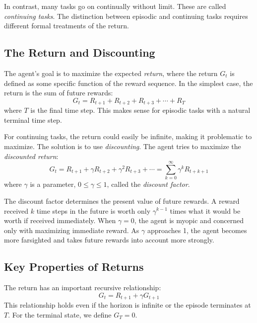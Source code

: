 \documentclass[12pt]{article}
\begin{document}
In contrast, many tasks go on continually without limit. These are called \textit{continuing tasks}. The distinction between episodic and continuing tasks requires different formal treatments of the return.

\subsection{The Return and Discounting}

The agent's goal is to maximize the expected \textit{return}, where the return $G_t$ is defined as some specific function of the reward sequence. In the simplest case, the return is the sum of future rewards:
\begin{equation}
G_t = R_{t+1} + R_{t+2} + R_{t+3} + \cdots + R_T
\end{equation}
where $T$ is the final time step. This makes sense for episodic tasks with a natural terminal time step.

For continuing tasks, the return could easily be infinite, making it problematic to maximize. The solution is to use \textit{discounting}. The agent tries to maximize the \textit{discounted return}:
\begin{equation}
G_t = R_{t+1} + \gamma R_{t+2} + \gamma^2 R_{t+3} + \cdots = \sum_{k=0}^{\infty} \gamma^k R_{t+k+1}
\end{equation}
where $\gamma$ is a parameter, $0 \le \gamma \le 1$, called the \textit{discount factor}.

The discount factor determines the present value of future rewards. A reward received $k$ time steps in the future is worth only $\gamma^{k-1}$ times what it would be worth if received immediately. When $\gamma = 0$, the agent is myopic and concerned only with maximizing immediate reward. As $\gamma$ approaches 1, the agent becomes more farsighted and takes future rewards into account more strongly.

\subsection{Key Properties of Returns}

The return has an important recursive relationship:
\begin{equation}
G_t = R_{t+1} + \gamma G_{t+1}
\end{equation}
This relationship holds even if the horizon is infinite or the episode terminates at $T$. For the terminal state, we define $G_T = 0$.
\end{document}
